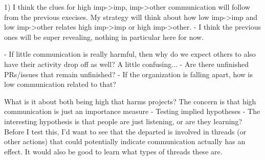 1) I think the clues for high imp->imp, imp->other communication will follow from the previous execises. My strategy will think about how low imp->imp and low imp->other relates high imp->imp or high imp->other. 
- I think the previous ones will be super revealing, nothing in particular here for now. 

- If little communication is really harmful, then why do we expect others to also have their activity drop off as well? A little confusing...
  - Are there unfinished PRs/issues that remain unfinished?
  - If the organization is falling apart, how is low communication related to that?

  
What is it about both being high that harms projects? The concern is that high communication is just an importance measure
- Testing implied hypotheses
  - The interesting hypothesis is that people are just listening, or are they learning? Before I test this, I'd want to see that the departed is involved in threads (or other actions) that could potentially indicate communication actually has an effect. It would also be good to learn what types of threads these are. 
\fi